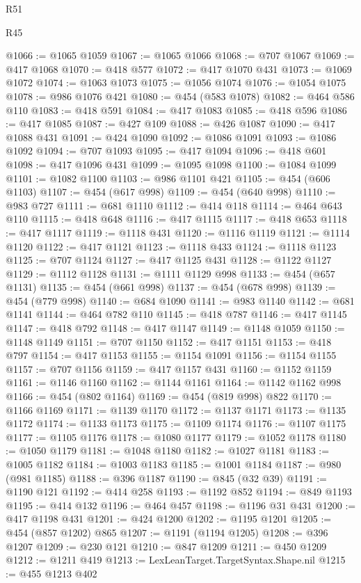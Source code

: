 \begin{lexlean}{R51}
\begin{lexlean}{R45}
\begin{coremodule}
{{{{{{{{{{{{{{{{{{{{{{{{{{{{{{{{{{{{{{{{{{{{{{{{{{{{{{{{{{{{{{{{{{{{{{{{{{{{{{{{{{{{{{{{{{{@1066 := @1065 @1059
@1067 := @1065 @1066
@1068 := @707 @1067
@1069 := @417 @1068
@1070 := @418 @577
@1072 := @417 @1070 @431
@1073 := @1069 @1072
@1074 := @1063 @1073
@1075 := @1056 @1074
@1076 := @1054 @1075
@1078 := @986 @1076 @421
@1080 := @454 (@583 @1078)
@1082 := @464 @586 @110
@1083 := @418 @591
@1084 := @417 @1083
@1085 := @418 @596
@1086 := @417 @1085
@1087 := @427 @109
@1088 := @426 @1087
@1090 := @417 @1088 @431
@1091 := @424 @1090
@1092 := @1086 @1091
@1093 := @1086 @1092
@1094 := @707 @1093
@1095 := @417 @1094
@1096 := @418 @601
@1098 := @417 @1096 @431
@1099 := @1095 @1098
@1100 := @1084 @1099
@1101 := @1082 @1100
@1103 := @986 @1101 @421
@1105 := @454 (@606 @1103)
@1107 := @454 (@617 @998)
@1109 := @454 (@640 @998)
@1110 := @983 @727
@1111 := @681 @1110
@1112 := @414 @118
@1114 := @464 @643 @110
@1115 := @418 @648
@1116 := @417 @1115
@1117 := @418 @653
@1118 := @417 @1117
@1119 := @1118 @431
@1120 := @1116 @1119
@1121 := @1114 @1120
@1122 := @417 @1121
@1123 := @1118 @433
@1124 := @1118 @1123
@1125 := @707 @1124
@1127 := @417 @1125 @431
@1128 := @1122 @1127
@1129 := @1112 @1128
@1131 := @1111 @1129 @998
@1133 := @454 (@657 @1131)
@1135 := @454 (@661 @998)
@1137 := @454 (@678 @998)
@1139 := @454 (@779 @998)
@1140 := @684 @1090
@1141 := @983 @1140
@1142 := @681 @1141
@1144 := @464 @782 @110
@1145 := @418 @787
@1146 := @417 @1145
@1147 := @418 @792
@1148 := @417 @1147
@1149 := @1148 @1059
@1150 := @1148 @1149
@1151 := @707 @1150
@1152 := @417 @1151
@1153 := @418 @797
@1154 := @417 @1153
@1155 := @1154 @1091
@1156 := @1154 @1155
@1157 := @707 @1156
@1159 := @417 @1157 @431
@1160 := @1152 @1159
@1161 := @1146 @1160
@1162 := @1144 @1161
@1164 := @1142 @1162 @998
@1166 := @454 (@802 @1164)
@1169 := @454 (@819 @998) @822
@1170 := @1166 @1169
@1171 := @1139 @1170
@1172 := @1137 @1171
@1173 := @1135 @1172
@1174 := @1133 @1173
@1175 := @1109 @1174
@1176 := @1107 @1175
@1177 := @1105 @1176
@1178 := @1080 @1177
@1179 := @1052 @1178
@1180 := @1050 @1179
@1181 := @1048 @1180
@1182 := @1027 @1181
@1183 := @1005 @1182
@1184 := @1003 @1183
@1185 := @1001 @1184
@1187 := @980 (@981 @1185)
@1188 := @396 @1187
@1190 := @845 (@32 @39)
@1191 := @1190 @121
@1192 := @414 @258
@1193 := @1192 @852
@1194 := @849 @1193
@1195 := @414 @132
@1196 := @464 @457
@1198 := @1196 @31 @431
@1200 := @417 @1198 @431
@1201 := @424 @1200
@1202 := @1195 @1201
@1205 := @454 (@857 @1202) @865
@1207 := @1191 (@1194 @1205)
@1208 := @396 @1207
@1209 := @230 @121
@1210 := @847 @1209
@1211 := @450 @1209
@1212 := @1211 @419
@1213 := LexLeanTarget.TargetSyntax.Shape.nil
@1215 := @455 @1213 @402
}}}}}}}}}}}}}}}}}}}}}}}}}}}}}}}}}}}}}}}}}}}}}}}}}}}}}}}}}}}}}}}}}}}}}}}}}}}}}}}}}}}}}}}}}}}
\end{coremodule}
\end{lexlean}
\end{lexlean}
